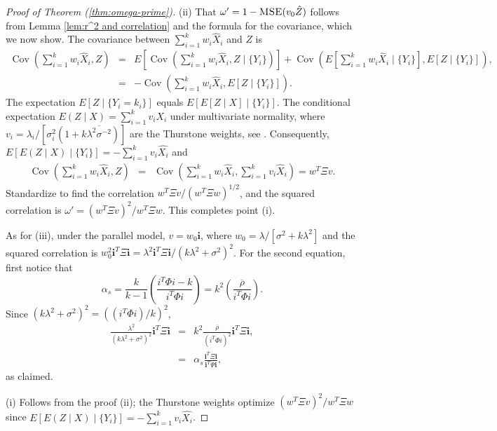 \documentclass[twoside]{article}
\DeclareMathOperator{\Cov}{Cov}
\DeclareMathOperator{\MSE}{\textsc{MSE}}
\renewcommand{\sqrt}[1]{{(#1)^{1/2}}}
\begin{document}
\begin{proof}[Proof of Theorem (\ref{thm:omega-prime})]
\label{proof:omega-prime}(ii) That $\omega'=1-\MSE(v_{0}\hat{Z})$
follows from Lemma \ref{lem:r^2 and correlation} and the formula
for the covariance, which we now show. The covariance between $\sum_{i=1}^{k}w_{i}\hat{X}_{i}$
and $Z$ is
\begin{eqnarray*}
\Cov(\sum_{i=1}^{k}w_{i}\hat{X}_{i},Z) & = & E[\Cov(\sum_{i=1}^{k}w_{i}\hat{X}_{i},Z\mid\{Y_{i}\})]+\Cov(E\left[\sum_{i=1}^{k}w_{i}\hat{X}_{i}\mid\{Y_{i}\}\right],E\left[Z\mid\{Y_{i}\}\right]),\\
 & = & -\Cov\left(\sum_{i=1}^{k}w_{i}\hat{X}_{i},E\left[Z\mid\{Y_{i}\}\right]\right).
\end{eqnarray*}
The expectation $E\left[Z\mid\{Y_{i}=k_{i}\}\right]$ equals $E\left[E\left[Z\mid X\right]\mid\{Y_{i}\}\right]$.
The conditional expectation $E(Z\mid X)=\sum_{i=1}^{k}v_{i}X_{i}$
under multivariate normality, where $v_{i}=\lambda_{i}/[\sigma_{i}^{2}(1+k\overline{\lambda^{2}\sigma^{-2}})]$
are the Thurstone weights, see \citet[Theorem 3.3.4]{Tong1990-lm}.
Consequently, $E[E(Z\mid X)\mid\{Y_{i}\}]=-\sum_{i=1}^{k}v_{i}\hat{X_{i}}$
and 
\begin{eqnarray*}
\Cov(\sum_{i=1}^{k}w_{i}\hat{X}_{i},Z) & = & \Cov\left(\sum_{i=1}^{k}w_{i}\hat{X}_{i},\sum_{i=1}^{k}v_{i}\hat{X}_{i}\right)=w^{T}\Xi v.
\end{eqnarray*}
Standardize to find the correlation $w^{T}\Xi v/\sqrt{w^{T}\Xi w}$,
and the squared correlation is $\omega'=(w^{T}\Xi v)^{2}/w^{T}\Xi w$.
This completes point (i). 

As for (iii), under the parallel model, $v=w_{0}\mathbf{i}$, where
$w_{0}=\lambda/[\sigma^{2}+k\lambda^{2}]$ and the squared correlation
is $w_{0}^{2}\mathbf{i}^{T}\Xi\mathbf{i}=\lambda^{2}\mathbf{i}^{T}\Xi\mathbf{i}/\left(k\lambda^{2}+\sigma^{2}\right)^{2}$.
For the second equation, first notice that
\[
\alpha_{s}=\frac{k}{k-1}\left(\frac{i^{T}\Phi i-k}{i^{T}\Phi i}\right)=k^{2}\left(\frac{\overline{\rho}}{i^{T}\Phi i}\right).
\]
Since $(k\lambda^{2}+\sigma^{2})^{2}=((i^{T}\Phi i)/k)^{2}$, 
\begin{eqnarray*}
\frac{\lambda^{2}}{\left(k\lambda^{2}+\sigma^{2}\right)^{2}}\mathbf{i}^{T}\Xi\mathbf{i} & = & k^{2}\frac{\overline{\rho}}{(i^{T}\Phi i)^{2}}\mathbf{i}^{T}\Xi\mathbf{i},\\
 & = & \alpha_{s}\frac{\mathbf{i}^{T}\Xi\mathbf{i}}{\mathbf{i}^{T}\Psi\mathbf{i}},
\end{eqnarray*}
as claimed.

(i) Follows from the proof (ii); the Thurstone weights optimize $(w^{T}\Xi v)^{2}/w^{T}\Xi w$
since $E[E(Z\mid X)\mid\{Y_{i}\}]=-\sum_{i=1}^{k}v_{i}\hat{X_{i}}$.
\end{proof}

%
%

\end{document}
